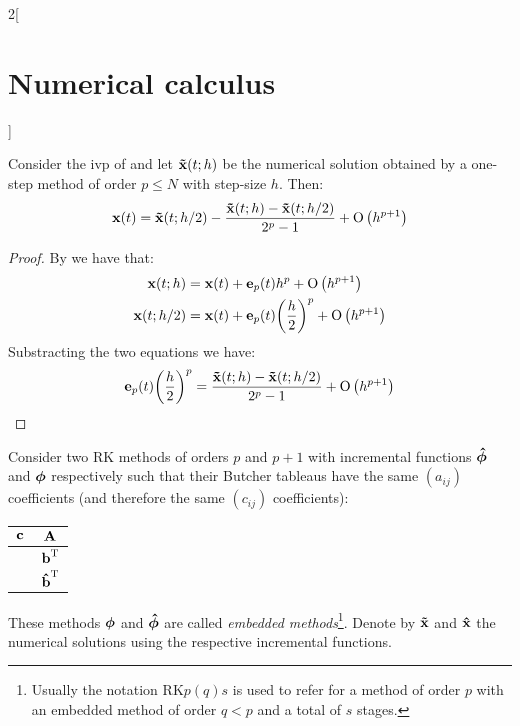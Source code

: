 \documentclass[../../../main_math.tex]{subfiles}
\begin{document}
\begin{multicols}{2}[\section{Numerical calculus}]
  \begin{theorem}
    Consider the ivp of  and let $\boldsymbol{\mathrm{\tilde{x}}}(t;h)$ be the numerical solution obtained by a one-step method of order $p\leq N$ with step-size $h$. Then:
    $$\boldsymbol{\mathrm{x}}(t)=\boldsymbol{\mathrm{\tilde{x}}}(t;h/2)-\frac{\boldsymbol{\mathrm{\tilde{x}}}(t;h)-\boldsymbol{\mathrm{\tilde{x}}}(t;h/2)}{2^p-1}+\mathrm{O}\left(h^{p+1}\right)$$
  \end{theorem}
  \begin{proof}
    By  we have that:
    \begin{align*}
      \boldsymbol{\mathrm{x}}(t;h)   & =\boldsymbol{\mathrm{x}}(t)+\boldsymbol{\mathrm{e}}_p(t)h^p+\mathrm{O}\left(h^{p+1}\right)                          \\
      \boldsymbol{\mathrm{x}}(t;h/2) & =\boldsymbol{\mathrm{x}}(t)+\boldsymbol{\mathrm{e}}_p(t){\left(\frac{h}{2}\right)}^p+\mathrm{O}\left(h^{p+1}\right)
    \end{align*}
    Substracting the two equations we have:
    $$\boldsymbol{\mathrm{e}}_p(t){\left(\frac{h}{2}\right)}^p=\frac{\boldsymbol{\mathrm{\tilde{x}}}(t;h)-\boldsymbol{\mathrm{\tilde{x}}}(t;h/2)}{2^p-1}+\mathrm{O}\left(h^{p+1}\right)$$
  \end{proof}
  \begin{theorem}
    Consider two RK methods of orders $p$ and $p+1$ with incremental functions $\boldsymbol{\mathrm{\hat\phi}}$ and $\boldsymbol{\mathrm{\phi}}$ respectively such that their Butcher tableaus have the same $(a_{ij})$ coefficients (and therefore the same $(c_{ij})$ coefficients):
    \begin{center}
      \renewcommand{\arraystretch}{1.25}
      \begin{tabular}{c|c}
        $\boldsymbol{\mathrm{c}}$ & $\boldsymbol{\mathrm{A}}$                   \\
        \hline
                 & ${\boldsymbol{\mathrm{b}}}^{\mathrm{T}}$       \\
                 & ${\boldsymbol{\mathrm{\hat{b}}}}^{\mathrm{T}}$
      \end{tabular}
    \end{center}
    These methods $\boldsymbol{\mathrm{\phi}}$ and $\boldsymbol{\mathrm{\hat\phi}}$ are called \emph{embedded methods}\footnote{Usually the notation $\mathrm{RK}p(q)s$ is used to refer for a method of order $p$ with an embedded method of order $q< p$ and a total of $s$ stages.}. Denote by $\boldsymbol{\mathrm{\tilde{x}}}$ and $\boldsymbol{\mathrm{\hat{x}}}$ the numerical solutions using the respective incremental functions.

\end{theorem}
\end{multicols}
\end{document}
